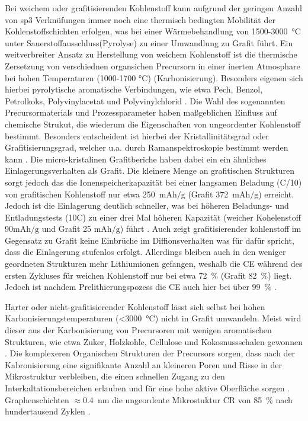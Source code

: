 Bei weichem oder grafitisierenden Kohlenstoff kann aufgrund der geringen Anzahl von sp3 Verknüfungen immer noch eine thermisch bedingten Mobilität der Kohlenstoffschichten erfolgen, was bei einer Wärmebehandlung von 1500-3000~$\si{\degreeCelsius}$ unter Sauerstoffausschluss(Pyrolyse) zu einer Umwandlung zu Grafit führt. Ein weitverbreiter Ansatz zu Herstellung von weichem Kohlenstoff ist die thermische Zersetzung von verschiednen organsichen Precursorn in einer inerten Atmosphare bei hohen Temperaturen (1000-1700 $\si{\degreeCelsius}$) (Karbonisierung). Besonders eigenen sich hierbei pyrolytische aromatische Verbindungen, wie etwa Pech, Benzol, Petrolkoks, Polyvinylacetat und Polyvinylchlorid \cite{Wang2021}. Die Wahl des sogenannten Precursormaterials und Prozessparameter haben maßgeblichen Einfluss auf chemische Strukut, die wiederum die Eigenschaften von ungeordenter Kohlenstoff bestimmt. Besonders entscheident ist hierbei der Kristallinitätsgrad oder Grafitisierungsgrad, welcher u.a. durch Ramanspektroskopie bestimmt werden kann \cite{Yu2014}. Die micro-kristalinen Grafitberiche haben dabei ein ein ähnliches Einlagerungsverhalten als Grafit. Die kleinere Menge an grafitischen Strukturen sorgt jedoch das die Ionenspeicherkapazität bei einer langsamen Beladung (C/10) von grafitischen Kohlenstoff nur etwa 250~$\si{\mA \hour \per \g}$ (Grafit 372~$\si{\mA \hour \per \g}$) erreicht. Jedoch ist die Einlagerung deutlich schneller, was bei höheren Beladungs- und Entladungstests (10C) zu einer drei Mal höheren Kapazität (weicher Kohelenstoff 90$\si{\mA \hour \per \g}$ und Grafit 25 $\si{\mA \hour \per \g}$) führt \cite{Schroeder2014}. Auch zeigt grafitisierender kohlenstoff im Gegensatz zu Grafit keine Einbrüche im Diffionsverhalten was für dafür spricht, dass die Einlagerung stufenlos erfolgt. Allerdings bleiben auch in den weniger geordneten Strukturen  mehr Lithiumionen gefangen, weshalb die CE während des ersten Zykluses für weichen Kohlenstoff nur bei etwa 72~\% (Grafit 82~\%) liegt. Jedoch ist nachdem Prelithierungspozess die CE auch hier bei über 99~\% \cite{Schroeder2014}. 

Harter oder nicht-grafitisierender Kohlenstoff lässt sich selbst bei hohen Karbonisierungstemperaturen (<3000~$\si{\degreeCelsius}$) nicht in Grafit umwandeln. Meist wird dieser aus der Karbonisierung von Precursoren mit wenigen aromatischen Strukturen, wie etwa Zuker, Holzkohle, Cellulose und Kokosnussschalen gewonnen \cite{Wang2021}. Die komplexeren Organischen Strukturen der Precursors sorgen, dass nach der Kabronisierung eine signifikante Anzahl an kleineren Poren und Risse in der Mikrostruktur verbleiben, die einen schnellen Zugang zu den Interkaltationsbereichen erlauben und für eine hohe aktive Oberfläche sorgen \cite{Liu2019a}. Graphenschichten $\approx$0.4~$\si{\nm}$ die ungeordente Mikrostuktur 
CR von 85~\% nach hundertausend Zyklen \cite{Cao2014}.

